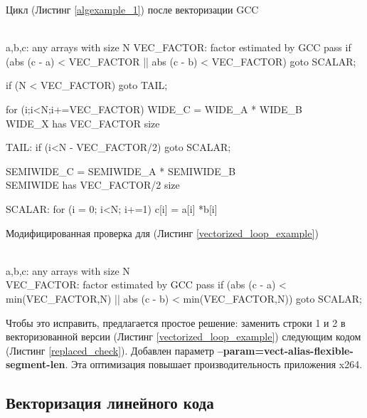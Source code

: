 \begin{ListingEnv}[!h]
	\captiondelim{ } %
	\caption{Цикл (Листинг \ref{algexample_1}) после векторизации GCC}\label{vectorized_loop_example}

	\begin{Verb}

		\\ a,b,c: any arrays with size N
		VEC_FACTOR: factor estimated by GCC pass
		if  (abs (c - a) < VEC_FACTOR  ||  
		     abs (c - b) < VEC_FACTOR) 
		    goto SCALAR;

		if (N < VEC_FACTOR)
		    goto TAIL;
			
		for (i;i<N;i+=VEC_FACTOR)
		    WIDE_C = WIDE_A * WIDE_B 
		    \\ WIDE_X has VEC_FACTOR size 
			
		TAIL:
		if (i<N - VEC_FACTOR/2)
		    goto SCALAR;
			
		SEMIWIDE_C = SEMIWIDE_A * SEMIWIDE_B 
		\\ SEMIWIDE has VEC_FACTOR/2 size 
		
		SCALAR:
		for (i = 0; i<N; i+=1)
		    c[i] = a[i] *b[i]

	\end{Verb}
\end{ListingEnv}

\begin{ListingEnv}[!h]
	\captiondelim{ } %
	\caption{Модифицированная проверка для (Листинг \ref{vectorized_loop_example})}\label{replaced_check}
	
	\begin{Verb}
		
		
		\\ a,b,c: any arrays with size N
		\\ VEC_FACTOR: factor estimated by GCC pass
		if (abs (c - a) < min(VEC_FACTOR,N) ||
		    abs (c - b) < min(VEC_FACTOR,N)) 
		   goto SCALAR;
	\end{Verb}
\end{ListingEnv} 

Чтобы это исправить, предлагается простое решение: заменить строки 1 и 2 в векторизованной версии (Листинг \ref{vectorized_loop_example}) следующим кодом (Листинг \ref{replaced_check}). Добавлен параметр \textbf{--param=vect-alias-flexible-segment-len}. Эта оптимизация повышает производительность приложения x264.

\subsection {Векторизация линейного кода}

